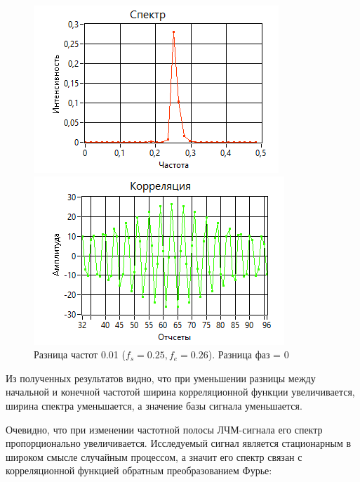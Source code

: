 \begin{figure}[H]
    \centering
    \begin{minipage}{0.49\linewidth}
        \includegraphics[width =0.9\linewidth]{imgs/spec4.png}
    \end{minipage}
    \begin{minipage}{0.49\linewidth}
        \includegraphics[width =0.9\linewidth]{imgs/corr4.png}
    \end{minipage}
	\caption{Разница частот 0.01 ($f_{s}=0.25, f_{e}=0.26$). Разница фаз = 0}
	\label{fig:spec4}
\end{figure}

Из полученных результатов видно, что при уменьшении разницы между начальной
и конечной частотой ширина корреляционной функции увеличивается, ширина спектра уменьшается,
а значение базы сигнала уменьшается.

Очевидно, что при  изменении частотной полосы ЛЧМ-сигнала его спектр
пропорционально увеличивается. Исследуемый сигнал является стационарным в
широком смысле случайным процессом, а значит его спектр связан с корреляционной
функцией обратным преобразованием Фурье:

